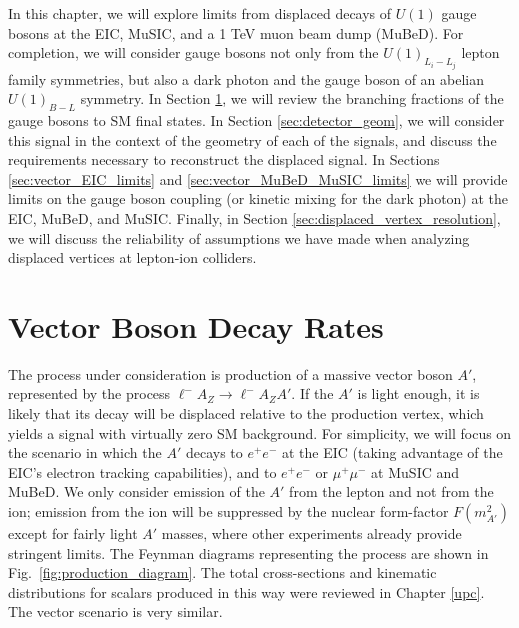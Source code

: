 In this chapter, we will explore limits from displaced decays of $U(1)$ gauge bosons at the EIC, MuSIC, and a 1 TeV muon beam dump (MuBeD). For completion, we will consider gauge bosons not only from the $U(1)_{L_i - L_j}$ lepton family symmetries, but also a dark photon and the gauge boson of an abelian $U(1)_{B-L}$ symmetry. In Section \ref{sec:vector_boson_decay}, we will review the branching fractions of the gauge bosons to SM final states. In Section \ref{sec:detector_geom}, we will consider this signal in the context of the geometry of each of the signals, and discuss the requirements necessary to reconstruct the displaced signal. In Sections \ref{sec:vector_EIC_limits} and \ref{sec:vector_MuBeD_MuSIC_limits} we will provide limits on the gauge boson coupling (or kinetic mixing for the dark photon) at the EIC, MuBeD, and MuSIC. Finally, in Section \ref{sec:displaced_vertex_resolution}, we will discuss the reliability of assumptions we have made when analyzing displaced vertices at lepton-ion colliders.


\section{Vector Boson Decay Rates}\label{sec:vector_boson_decay}
The process under consideration is production of a massive vector boson $A'$, represented by the process $\ell^- A_Z \rightarrow \ell^- A_Z A'$. If the $A'$ is light enough, it is likely that its decay will be displaced relative to the production vertex, which yields a signal with virtually zero SM background. For simplicity, we will focus on the scenario in which the $A'$ decays to $e^+ e^-$ at the EIC (taking advantage of the EIC's electron tracking capabilities), and to $e^+e^-$ or $\mu^+\mu^-$ at MuSIC and MuBeD. We only consider emission of the $A'$ from the lepton and not from the ion; emission from the ion will be suppressed by the nuclear form-factor $F(m_{A'}^2)$ except for fairly light $A'$ masses, where other experiments already provide stringent limits. The Feynman diagrams representing the process are shown in Fig.~\ref{fig:production_diagram}. The total cross-sections and kinematic distributions for scalars produced in this way were reviewed in Chapter \ref{upc}. The vector scenario is very similar. 


